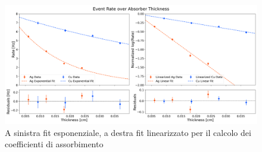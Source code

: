 \documentclass[twocolumn,10pt]{asme2ej}
\begin{document}
\begin{table}[t]
        \centering
        \caption{Dati fit esponenziale per il calcolo del coefficiente di assorbimento}
        \label{t:assorbimento}
        \end{table}
        \vspace{-15pt}


        \begin{figure}[t]
            \centering
            \includegraphics[width=\textwidth]{../Plots/attenuation_coeff.png}
           \caption{A sinistra fit esponenziale, a destra fit linearizzato per il calcolo dei coefficienti di assorbimento}
            \label{i:attenuation}
        \end{figure}
\end{document}
